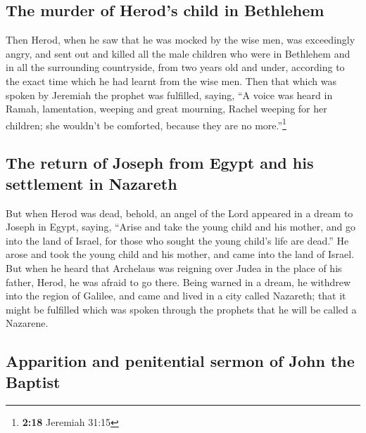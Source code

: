 \hypertarget{the-murder-of-herods-child-in-bethlehem}{%
\subsection{The murder of Herod's child in
Bethlehem}\label{the-murder-of-herods-child-in-bethlehem}}

 Then Herod, when he saw that he was mocked by the wise
men, was exceedingly angry, and sent out and killed all the male
children who were in Bethlehem and in all the surrounding countryside,
from two years old and under, according to the exact time which he had
learnt from the wise men.  Then that which was spoken by
Jeremiah the prophet was fulfilled, saying,  ``A voice
was heard in Ramah, lamentation, weeping and great mourning, Rachel
weeping for her children; she wouldn't be comforted, because they are no
more.''\footnote{\textbf{2:18} Jeremiah 31:15}

\hypertarget{the-return-of-joseph-from-egypt-and-his-settlement-in-nazareth}{%
\subsection{The return of Joseph from Egypt and his settlement in
Nazareth}\label{the-return-of-joseph-from-egypt-and-his-settlement-in-nazareth}}

 But when Herod was dead, behold, an angel of the Lord
appeared in a dream to Joseph in Egypt, saying,  ``Arise
and take the young child and his mother, and go into the land of Israel,
for those who sought the young child's life are dead.'' 
He arose and took the young child and his mother, and came into the land
of Israel.  But when he heard that Archelaus was reigning
over Judea in the place of his father, Herod, he was afraid to go there.
Being warned in a dream, he withdrew into the region of Galilee,
 and came and lived in a city called Nazareth; that it
might be fulfilled which was spoken through the prophets that he will be
called a Nazarene.

\hypertarget{apparition-and-penitential-sermon-of-john-the-baptist}{%
\subsection{Apparition and penitential sermon of John the
Baptist}\label{apparition-and-penitential-sermon-of-john-the-baptist}}

